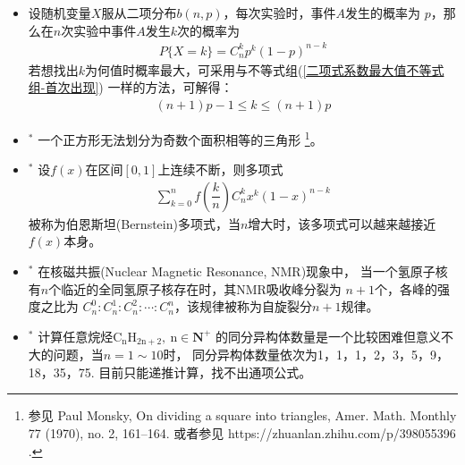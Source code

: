 \begin{itemize}[leftmargin=\inteval{\myitemleftmargin}pt,itemsep=
   \inteval{\myitemitempsep}pt,topsep=\inteval{\myitemtopsep}pt]
\item 设随机变量$ X $服从二项分布$ b(n,p) $，每次实验时，事件$ A $发生的概率为
$ p $，那么在$ n $次实验中事件$ A $发生$ k $次的概率为
\begin{align*}
    P\{X=k\}=C_n^kp^k(1-p)^{n-k}
\end{align*}
若想找出$ k $为何值时概率最大，可采用与不等式组(\ref{二项式系数最大值不等式组-首次出现})
一样的方法，可解得：
\begin{align*}
    (n+1)p-1\leq k \leq (n+1)p 
\end{align*}


\item $^*$ 一个正方形无法划分为奇数个面积相等的三角形
\footnote{参见 Paul Monsky, On dividing a square into triangles, Amer. Math. Monthly 77 (1970), no. 2, 161–164. 或者参见 https://zhuanlan.zhihu.com/p/398055396 . }。

\item $^*$ 设$ f(x) $在区间$ [0,1] $上连续不断，则多项式
\begin{gather*}
    \sum_{k=0}^{n}f\left(\dfrac{k}{n}\right)C_n^kx^k(1-x)^{n-k}
\end{gather*}
被称为伯恩斯坦(Bernstein)多项式，当$ n $增大时，该多项式可以越来越接近$ f(x) $本身。

\item $^*$ 在核磁共振(Nuclear Magnetic Resonance, NMR)现象中，
当一个氢原子核有$ n $个临近的全同氢原子核存在时，其NMR吸收峰分裂为
$ n+1 $个，各峰的强度之比为
$ C_n^0:C_n^1:C_n^2:\cdots :C_n^n $，该规律被称为自旋裂分$ n+1 $规律。

\item $^*$ 计算任意烷烃$ \mathrm{C_nH_{2n+2},\ n}\in \textbf{N}^+ $
的同分异构体数量是一个比较困难但意义不大的问题，当$ n=1\sim 10 $时，
同分异构体数量依次为1，1，1，2，3，5，9，18，35，75.
目前只能递推计算，找不出通项公式。

\end{itemize}

